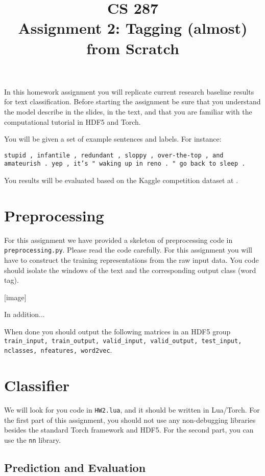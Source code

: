 \documentclass[11pt]{article}
\title{CS 287 \\ Assignment 2: Tagging (almost) from Scratch }
\date{}
\begin{document}
\maketitle{}

In this homework assignment you will replicate current
research baseline results for text classification. Before 
starting the assignment be sure that you understand the model 
describe in the slides, in the text, and that you are familiar 
with the computational tutorial in HDF5 and Torch. 


You will be given a set of example sentences and labels. For instance: 


\vspace{0.5cm}

\noindent
\texttt{stupid , infantile , redundant , sloppy , over-the-top , and amateurish . yep , it's " waking up in reno . " go back to sleep . }

You results will be evaluated based on the Kaggle competition dataset at \url{}.

\section{Preprocessing}

For this assignment we have provided a skeleton of preprocessing
code in \texttt{preprocessing.py}. Please read the code carefully.
For this assignment you will have to construct the training 
representations from the raw input data. You code should isolate 
the windows of the text and the corresponding output class (word tag).


[image]

In addition...

When done you should output the following matrices in an HDF5 group
\texttt{train\_input, train\_output, valid\_input, valid\_output,
  test\_input, nclasses, nfeatures, word2vec}.


\section{Classifier}

We will look for you code in \texttt{HW2.lua}, and it should be
written in Lua/Torch. For the first part of this assignment, you
should not use any non-debugging libraries besides the standard Torch
framework and HDF5. For the second part, you can use the \texttt{nn}
library.

\subsection{Prediction and Evaluation}
\end{document}

